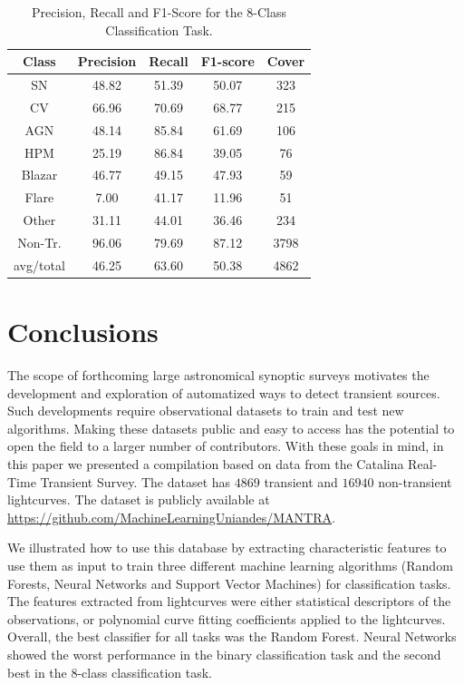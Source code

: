 \documentclass[twocolumn]{aastex62}
\begin{document}
\begin{table}
\centering
\begin{tabular}{ccccc}
\hline
\textbf{Class} & \textbf{Precision} & \textbf{Recall} & \textbf{F1-score}& \textbf{Cover} \\\hline \hline
SN             & 48.82	& 51.39 &	50.07	 & 323 \\\hline
CV             & 66.96	& 70.69 &	68.77	 & 215 \\\hline
AGN            & 48.14	& 85.84 &	61.69	 & 106 \\\hline
HPM            & 25.19	& 86.84 &	39.05	 & 76 \\\hline
Blazar         & 46.77	& 49.15 &	47.93	 & 59 \\\hline
Flare          & 7.00	& 41.17 &	11.96	 & 51 \\\hline
Other          & 31.11	& 44.01 &	36.46	 & 234 \\\hline
Non-Tr.        & 96.06	& 79.69 &	87.12	 & 3798 \\\hline
avg/total      & 46.25	& 63.60 &	50.38	 & 4862 \\\hline
\end{tabular}%
\caption{Precision, Recall and F1-Score for the 8-Class Classification Task.}
\label{Overall-Scores-8-Class-Regular}
\end{table}



\section{Conclusions}
\label{sec:conclusions}

The scope of forthcoming large astronomical synoptic surveys 
motivates the development and exploration of automatized ways to
detect transient sources. 
Such developments require observational datasets to train and test new
algorithms.  
Making these datasets public and easy to access has the potential
to open the field to a larger number of contributors.
With these goals in mind, in this paper we presented a compilation
based on data from the Catalina Real-Time Transient Survey.
The dataset has  $4869$ transient and $16940$ non-transient
lightcurves. 
The dataset is publicly available at
\url{https://github.com/MachineLearningUniandes/MANTRA}.   

We illustrated how to use this database by extracting 
characteristic features to use them as input to train three different
machine learning algorithms (Random Forests, Neural Networks and
Support Vector Machines) for classification tasks.
The features extracted from lightcurves were either statistical
descriptors of the observations, or polynomial curve fitting
coefficients applied to the lightcurves.   
Overall, the best classifier for all tasks was the Random Forest.
Neural Networks showed the worst performance in the binary
classification task and the second best in the 8-class classification
task. 
\end{document}
